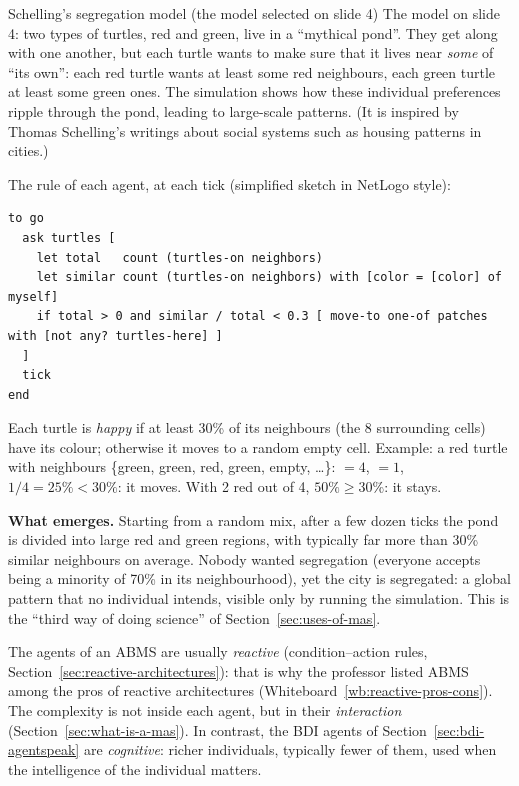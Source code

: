 \begin{nbexample}{Schelling's segregation model (the model selected on slide 4)}
The model on slide 4: two types of turtles, red and green, live in a ``mythical pond''. They
get along with one another, but each turtle wants to make sure that it lives near
\emph{some} of ``its own'': each red turtle wants at least some red neighbours, each green
turtle at least some green ones. The simulation shows how these individual preferences
ripple through the pond, leading to large-scale patterns. (It is inspired by Thomas
Schelling's writings about social systems such as housing patterns in cities.)

The rule of each agent, at each tick (simplified sketch in NetLogo style):
\begin{verbatim}
to go
  ask turtles [
    let total   count (turtles-on neighbors)
    let similar count (turtles-on neighbors) with [color = [color] of myself]
    if total > 0 and similar / total < 0.3 [ move-to one-of patches with [not any? turtles-here] ]
  ]
  tick
end
\end{verbatim}
Each turtle is \emph{happy} if at least 30\% of its neighbours (the 8 surrounding cells) have
its colour; otherwise it moves to a random empty cell. Example: a red turtle with neighbours
\{green, green, red, green, empty, \ldots\}:  $= 4$,  $= 1$,
$1/4 = 25\% < 30\%$: it moves. With 2 red out of 4, $50\% \geq 30\%$: it stays.

\textbf{What emerges.} Starting from a random mix, after a few dozen ticks the pond is
divided into large red and green regions, with typically far more than 30\% similar
neighbours on average. Nobody wanted segregation (everyone accepts being a minority of 70\%
in its neighbourhood), yet the city is segregated: a global pattern that no individual
intends, visible only by running the simulation. This is the ``third way of doing science''
of Section~\ref{sec:uses-of-mas}.
\end{nbexample}

\begin{nbintuition}
The agents of an ABMS are usually \emph{reactive} (condition--action rules,
Section~\ref{sec:reactive-architectures}): that is why the professor listed ABMS among the
pros of reactive architectures (Whiteboard~\ref{wb:reactive-pros-cons}). The complexity is
not inside each agent, but in their \emph{interaction} (Section~\ref{sec:what-is-a-mas}).
In contrast, the BDI agents of Section~\ref{sec:bdi-agentspeak} are \emph{cognitive}: richer
individuals, typically fewer of them, used when the intelligence of the individual matters.
\end{nbintuition}
